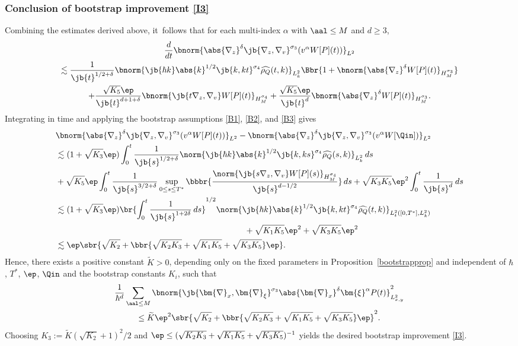 \subsubsection*{Conclusion of bootstrap improvement \eqref{I3}}
Combining the estimates derived above, it~follows that for each multi-index $\alpha$ with $\aal\leq M$ and $d\geq 3$,
\begin{multline*}
\frac{d}{dt}\bnorm{\abs{\nabla_z}^\delta\jb{\nabla_z,\nabla_v}^{\sigma_3}(v^\alpha W[P](t))}_{L^2}\\
\lesssim\frac{1}{\jb{t}^{1/2+\delta}}\bnorm{\jb{\hbar k}\abs{k}^{1/2}\jb{k,kt}^{\sigma_4} \widehat{\rho_Q}(t,k)}_{L^2_k}\Bbr{1+\bnorm{\abs{\nabla_z}^\delta W[P](t)}_{H^{\sigma_3}_M}}\\
+\frac{\sqrt{K_5}\ep}{\jb{t}^{d+1+\delta}}\bnorm{\jb{t\nabla_z,\nabla_v}W[P](t)}_{H^{\sigma_4}_M}+\frac{\sqrt{K_5}\ep}{\jb{t}^d}\bnorm{\abs{\nabla_z}^\delta W[P](t)}_{H^{\sigma_3}_M}.
\end{multline*}
Integrating in time and applying the bootstrap assumptions \eqref{B1}, \eqref{B2}, and \eqref{B3} gives
\begin{align*}
&\bnorm{\abs{\nabla_z}^\delta\jb{\nabla_z,\nabla_v}^{\sigma_3}(v^\alpha W[P](t))}_{L^2}-\bnorm{\abs{\nabla_z}^\delta\jb{\nabla_z,\nabla_v}^{\sigma_3}(v^\alpha W[\Qin])}_{L^2}\\
&\lesssim(1+\sqrt{K_3}\ep)\int_0^t\frac{1}{\jb{s}^{{1/2}+\delta}}\norm{\jb{\hbar k}\abs{k}^{1/2}\jb{k,ks}^{\sigma_4} \widehat{\rho_Q}(s,k)}_{L^2_k}\,ds\\
&+\sqrt{K_5}\ep\int_0^t\frac{1}{\jb{s}^{3/2+\delta}}\sup_{0\leq s\leq T^*}\bbbr{\frac{\norm{\jb{s\nabla_z,\nabla_v}W[P](s)}_{H^{\sigma_4}_M}}{\jb{s}^{d-1/2}}}\,ds+\sqrt{K_3K_5}\ep^2\int_0^t\frac{1}{\jb{s}^d}\,ds\\
&\lesssim(1+\sqrt{K_3}\ep)\br{\int_0^t\frac{1}{\jb{s}^{1+2\delta}}\,ds}^{1/2}\norm{\jb{\hbar k}\abs{k}^{1/2}\jb{k,kt}^{\sigma_4} \widehat{\rho_Q}(t,k)}_{L^2_{t}([0,T^*],L^2_k)}\\
&\hspace{8cm}+\sqrt{K_1K_5}\ep^2+\sqrt{K_3K_5}\ep^2\\
&\lesssim\ep\sbr{\sqrt{K_2}+\bbr{\sqrt{K_2K_3}+\sqrt{K_1K_5}+\sqrt{K_3K_5}}\ep}.
\end{align*}
Hence, there exists a positive constant $\widetilde K>0$, depending only on the fixed parameters in Proposition~\ref{bootstrapprop} and independent of $\hbar$, $T^*$, $\ep$, $\Qin$ and the bootstrap constants $K_i$, such that
\begin{multline*}
\frac{1}{\hbar^d}\sum_{\aal\leq M}\bnorm{\jb{\bm{\nabla}_x,\bm{\nabla}_\xi}^{\sigma_3}\abs{\bm{\nabla}_x}^\delta \bm{\xi}^\alpha P(t)}_{L^2_{x,y}}^2\\
\leq \widetilde K\ep^2\sbr{\sqrt{K_2}+\bbr{\sqrt{K_2K_3}+\sqrt{K_1K_5}+\sqrt{K_3K_5}}\ep}^2.
\end{multline*}
Choosing $K_3 := \widetilde K (\sqrt{K_2} + 1)^2 / 2$ and $\ep \leq (\sqrt{K_2 K_3} + \sqrt{K_1 K_5} + \sqrt{K_3 K_5})^{-1}$ yields the desired bootstrap improvement \eqref{I3}.

